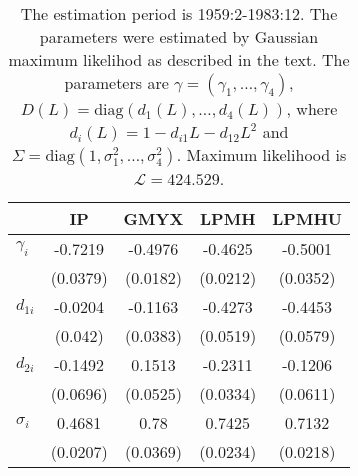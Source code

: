 \begin{table}[h!]
\centering\captionsetup{width=0.6\textwidth, font=small}
\caption{The estimation period is 1959:2-1983:12. The parameters were estimated by Gaussian maximum likelihod as described in the text. The parameters are $\gamma = (\gamma_1,\ldots, \gamma_4)$, $D(L)=\text{diag}\left(d_1(L),\ldots, d_4(L)\right)$, where $d_i(L) = 1-d_{i1}L - d_{12}L^2$ and $\Sigma = \text{diag} \left(1,\sigma_1^2,\ldots,\sigma_4^2\right)$. Maximum likelihood is $\mathcal{L}=424.529$.}\label{tab:ml-params1}
\begin{tabular}{l|cccc}
&IP&GMYX&LPMH&LPMHU\\\hline\hline
$\gamma_i$&-0.7219&-0.4976&-0.4625&-0.5001\\
&(0.0379)&(0.0182)&(0.0212)&(0.0352)\\
$d_{1i}$&-0.0204&-0.1163&-0.4273&-0.4453\\
&(0.042)&(0.0383)&(0.0519)&(0.0579)\\
$d_{2i}$&-0.1492&0.1513&-0.2311&-0.1206\\
&(0.0696)&(0.0525)&(0.0334)&(0.0611)\\
$\sigma_i$&0.4681&0.78&0.7425&0.7132\\&(0.0207)&(0.0369)&(0.0234)&(0.0218)\\\hline\hline
\end{tabular}
\end{table}